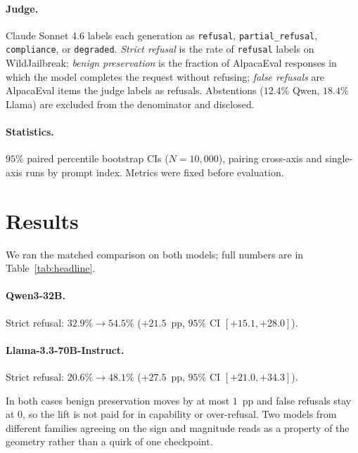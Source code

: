 \documentclass{article}
\begin{document}
\paragraph{Judge.} Claude Sonnet 4.6 labels each generation as
\texttt{refusal}, \texttt{partial\_refusal}, \texttt{compliance}, or
\texttt{degraded}. \emph{Strict refusal} is the rate of
\texttt{refusal} labels on WildJailbreak; \emph{benign preservation}
is the fraction of AlpacaEval responses in which the model completes
the request without refusing;
\emph{false refusals} are AlpacaEval items the judge labels as
refusals. Abstentions ($12.4\%$ Qwen, $18.4\%$ Llama) are excluded
from the denominator and disclosed.

\paragraph{Statistics.} $95\%$ paired percentile bootstrap CIs
($N=10{,}000$), pairing cross-axis and single-axis runs by prompt
index. Metrics were fixed before evaluation.

\section{Results}
\label{sec:results}

We ran the matched comparison on both models; full numbers are in
Table~\ref{tab:headline}.

\paragraph{Qwen3-32B.} Strict refusal: $32.9\% \rightarrow 54.5\%$
($+21.5$~pp, $95\%$ CI $[+15.1, +28.0]$).

\paragraph{Llama-3.3-70B-Instruct.} Strict refusal:
$20.6\% \rightarrow 48.1\%$ ($+27.5$~pp, $95\%$ CI $[+21.0, +34.3]$).

In both cases benign preservation moves by at most $1$~pp and false
refusals stay at $0$, so the lift is not paid for in capability or
over-refusal. Two models from different families agreeing on the sign
and magnitude reads as a property of the geometry rather than a quirk
of one checkpoint.
\end{document}
